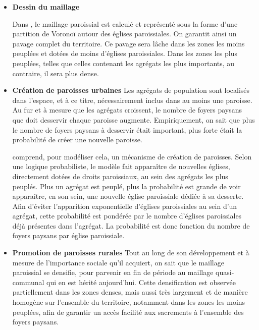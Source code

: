 \begin{itemize}
	\item \textbf{Dessin du maillage}
		\begin{tcolorbox}[breakable,left=0pt,right=0pt,top=0pt,bottom=0pt,
		colback=gray!15,colframe=gray!15,width=\dimexpr0.94\textwidth\relax, 
		enlarge left by=0mm, boxsep=5pt,arc=0pt,outer arc=0pt]
			Dans \simfeodal{}, le maillage paroissial est calculé et représenté sous la forme d'une partition de Voronoï autour des églises paroissiales.
			On garantit ainsi un pavage complet du territoire.
			Ce pavage sera lâche dans les zones les moins peuplées et dotées de 	moins d'églises paroissiales.
			Dans les zones les plus peuplées, telles que celles contenant les agrégats les plus importants, au contraire, il sera plus dense.
	\end{tcolorbox}
	
	\item \textbf{Création de paroisses \og urbaines\fg{}} Les agrégats de population sont localisés dans l'espace, et à ce titre, nécessairement inclus dans au moins une paroisse.
	Au fur et à mesure que les agrégats croissent, le nombre de foyers paysans que doit desservir chaque paroisse augmente.
	Empiriquement, on sait que plus le nombre de foyers paysans à desservir était important, plus forte était la probabilité de créer une nouvelle paroisse.
	
	\begin{tcolorbox}[breakable,left=0pt,right=0pt,top=0pt,bottom=0pt,
		colback=gray!15,colframe=gray!15,width=\dimexpr0.94\textwidth\relax, 
		enlarge left by=0mm, boxsep=5pt,arc=0pt,outer arc=0pt]
	\simfeodal{} comprend, pour modéliser cela, un mécanisme de création de paroisses.
	Selon une logique probabiliste, le modèle fait apparaître de nouvelles églises, directement dotées de droits paroissiaux, au sein des agrégats les plus peuplés.
	Plus un agrégat est peuplé, plus la probabilité est grande de voir apparaître, en son sein, une nouvelle église paroissiale dédiée à sa desserte.	
	Afin d'éviter l'apparition exponentielle d'églises paroissiales au sein d'un agrégat, cette probabilité est pondérée par le nombre d'églises paroissiales déjà présentes dans l'agrégat.
	La probabilité est donc fonction du nombre de foyers paysans par église paroissiale.
\end{tcolorbox}
	
	\item \textbf{Promotion de paroisses \og rurales\fg{}} Tout au long de son développement et à mesure de l'importance sociale qu'il acquiert, on sait que le maillage paroissial se densifie, pour parvenir en fin de période au maillage quasi-communal qui en est hérité aujourd'hui.
	Cette densification est observée partiellement dans les zones denses, mais aussi très largement et de manière homogène sur l'ensemble du territoire, notamment dans les zones les moins peuplées, afin de garantir un accès facilité aux sacrements à l'ensemble des foyers paysans.
	

\end{itemize}
